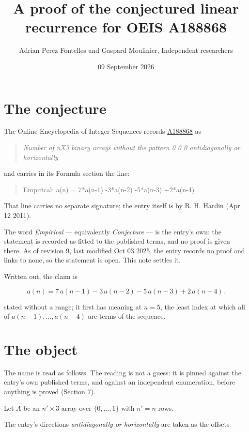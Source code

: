 \documentclass[11pt]{article}
\title{A proof of the conjectured linear recurrence for OEIS A188868}
\author{Adrian Perez Fontelles and Gaspard Moulinier, Independent researchers}
\date{09 September 2026}
\theoremstyle{definition}
\begin{document}
\maketitle
\section{The conjecture}

The Online Encyclopedia of Integer Sequences records \href{https://oeis.org/A188868}{A188868} as

\begin{quote}\itshape Number of nX3 binary arrays without the pattern 0 0 0 antidiagonally or horizontally\end{quote}

and carries in its Formula section the line:

\begin{quote}\ttfamily Empirical: a(n) = 7*a(n-1) -3*a(n-2) -5*a(n-3) +2*a(n-4)\end{quote}

That line carries no separate signature; the entry itself is by R. H. Hardin (Apr 12 2011).

The word {\itshape Empirical} --- equivalently {\itshape Conjecture} --- is the entry's own: the statement is recorded as fitted to the published terms, and no proof is given there. As of revision 9, last modified Oct 03 2025, the entry records no proof and links to none, so the statement is open. This note settles it.

Written out, the claim is

\[a(n) = 7\,a(n-1) - 3\,a(n-2) - 5\,a(n-3) + 2\,a(n-4).\]

stated without a range; it first has meaning at $n = 5$, the least index at which all of $a(n-1),\dots,a(n-4)$ are terms of the sequence.

\section{The object}

The name is read as follows. The reading is not a guess: it is pinned against the entry's own published terms, and against an independent enumeration, before anything is proved (Section 7).

Let $A$ be an $n' \times 3$ array over $\{0,\dots,1\}$ with $n' = n$ rows.

The entry's directions {\itshape antidiagonally or horizontally} are taken as the offsets
\end{document}
